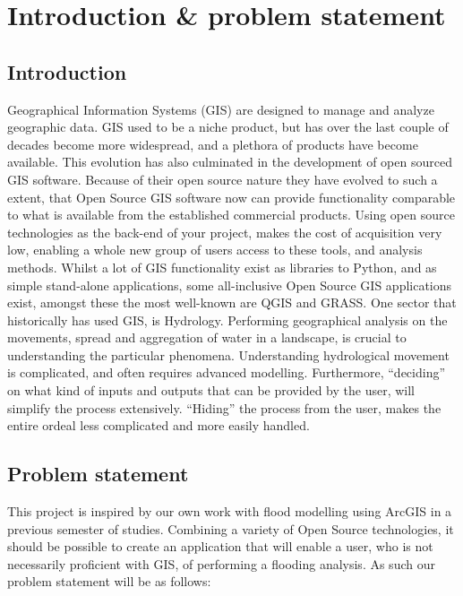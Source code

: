 
\chapter{Introduction \& problem statement} %

\label{ch:introduction} %


\section{Introduction}

Geographical Information Systems (GIS) are designed to manage and analyze geographic data. GIS used to be a niche product, but has over the last couple of decades become more widespread, and a plethora of products have become available. 
This evolution has also culminated in the development of open sourced GIS software. Because of their open source nature they have evolved to such a extent, that Open Source GIS software now can provide functionality comparable to what is available from the established commercial products. 
Using open source technologies as the back-end of your project, makes the cost of acquisition very low, enabling a whole new group of users access to these tools, and analysis methods. 
Whilst a lot of GIS functionality exist as libraries to Python, and as simple stand-alone applications, some all-inclusive Open Source GIS applications exist, amongst these the most well-known are QGIS and GRASS. 
One sector that historically has used GIS, is Hydrology. Performing geographical analysis on the movements, spread and aggregation of water in a landscape, is crucial to understanding the particular phenomena. 
Understanding hydrological movement is complicated, and often requires advanced modelling. 
Furthermore, “deciding” on what kind of inputs and outputs that can be provided by the user, will simplify the process extensively. “Hiding” the process from the user, makes the entire ordeal less complicated and more easily handled.



\section{Problem statement}
This project is inspired by our own work with flood modelling using ArcGIS in a previous semester of studies. 
Combining a variety of Open Source technologies, it should be possible to create an application that will enable a user, who is not necessarily proficient with GIS, of performing a flooding analysis. As such our problem statement will be as follows:  

